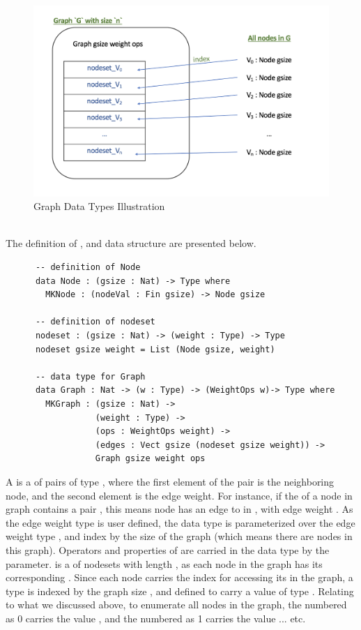 \begin{figure}[H]
  \centering
  \includegraphics[scale = 0.6]{./figure/graphType.png}
  \caption{Graph Data Types Illustration}
  \label{figure2}
\end{figure}
\tab\\
The definition of ,  and  data structure are presented below.

\begin{lstlisting}
      -- definition of Node
      data Node : (gsize : Nat) -> Type where
        MKNode : (nodeVal : Fin gsize) -> Node gsize

      -- definition of nodeset
      nodeset : (gsize : Nat) -> (weight : Type) -> Type
      nodeset gsize weight = List (Node gsize, weight)

      -- data type for Graph
      data Graph : Nat -> (w : Type) -> (WeightOps w)-> Type where
        MKGraph : (gsize : Nat) ->
                  (weight : Type) ->
                  (ops : WeightOps weight) ->
                  (edges : Vect gsize (nodeset gsize weight)) ->
                  Graph gsize weight ops
\end{lstlisting}

A  is a  of pairs of type , where the first element of the pair is the neighboring node, and the second element is the edge weight. For instance, if the  of a node  in graph  contains a pair , this means node  has an edge to  in , with edge weight . As the edge weight type is user defined, the  data type is parameterized over the edge weight type , and index by the size of the graph (which means there are  nodes in this graph). Operators and properties of  are carried in the  data type by the  parameter.  is a  of {nodeset}s with length , as each node in the graph has its corresponding . Since each node carries the index for accessing its  in the graph, a  type is indexed by the graph size , and defined to carry a value of type . Relating to what we discussed above, to enumerate all nodes in the graph, the  numbered as 0 carries the value , and the  numbered as 1 carries the value  ... etc.
\\

